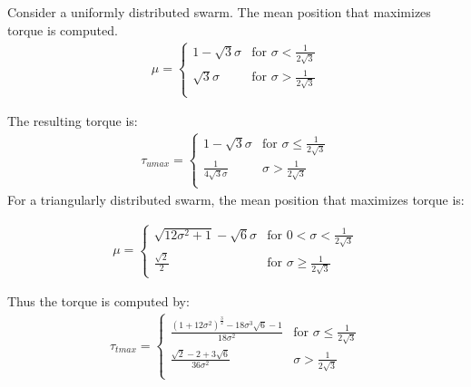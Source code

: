 Consider a uniformly distributed swarm. The mean position that maximizes torque is computed.
\begin{align}
\mu=\left\{
\begin{array}{ll}
1-\sqrt{3}\sigma &   \textrm{for     } \sigma < \frac{1}{2\sqrt{3}}\\
\sqrt{3}\sigma &   \textrm{for     } \sigma > \frac{1}{2\sqrt{3}}\\
\end{array} 
\right.
\end{align}

The resulting torque is:
\begin{align}
\tau_{umax} =\left\{
\begin{array}{ll}
1-\sqrt{3}\sigma &   \textrm{for     } \sigma \leq \frac{1}{2\sqrt{3}}\\
\frac{1}{4 \sqrt{3}\sigma} &   \sigma > \frac{1}{2\sqrt{3}}\\
\end{array} 
\right.
\end{align}
For a triangularly distributed swarm, the mean position that maximizes torque is:

\begin{align}
\mu= \left\{
\begin{array}{ll}
 \sqrt{12\sigma^2 +1}  -\sqrt{6}\sigma &   \textrm{for     } 0< \sigma  <\frac{1}{2\sqrt{3}} \\
 \frac{\sqrt{2}}{2} &   \textrm{for     } \sigma \geq \frac{1}{2\sqrt{3}} 
\end{array} 
\right.
\end{align}

Thus the torque is computed by:
\begin{align}\label{eq:triMaxTorque}
\tau_{tmax} =\left\{
\begin{array}{ll}
\frac{(1+12\sigma^2)^{\frac{3}{2}}- 18\sigma^3\sqrt{6}-1}{18\sigma^2} &   \textrm{for     } \sigma \leq \frac{1}{2\sqrt{3}}\\
\frac{\sqrt{2}-2+3\sqrt{6}}{36\sigma^2} &   \sigma > \frac{1}{2\sqrt{3}}\\
\end{array} 
\right.
\end{align}


